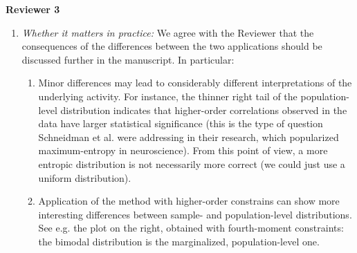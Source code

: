 \documentclass{article}
\begin{document}
\bigskip

\textbf{Reviewer 3}
\begin{enumerate}[wide]
\item \emph{Whether it matters in practice:} We agree with the Reviewer
  that the consequences of the differences between the two applications
  should be discussed further in the manuscript. In particular:
  \begin{enumerate}[label=\alph*.,itemsep=0ex]
  \item Minor differences may lead to considerably different
    interpretations of the underlying activity. For instance, the thinner
    right tail of the population-level distribution indicates that
    higher-order correlations observed in the data have larger statistical
    significance (this is the type of question Schneidman et al. were
    addressing in their research, which popularized maximum-entropy in
    neuroscience). From this point of view, a more entropic distribution is
    not necessarily more correct (we could just use a uniform distribution).
  \item
    \begin{minipage}[t]{0.74\linewidth}
      Application of the method with higher-order constrains can show more
      interesting differences between sample- and population-level
      distributions. See e.g. the plot on the right, obtained with
      fourth-moment constraints: the bimodal
      distribution is the marginalized, population-level one.
    \end{minipage}\hspace{\fill}
\end{enumerate}
\end{enumerate}
\end{document}
